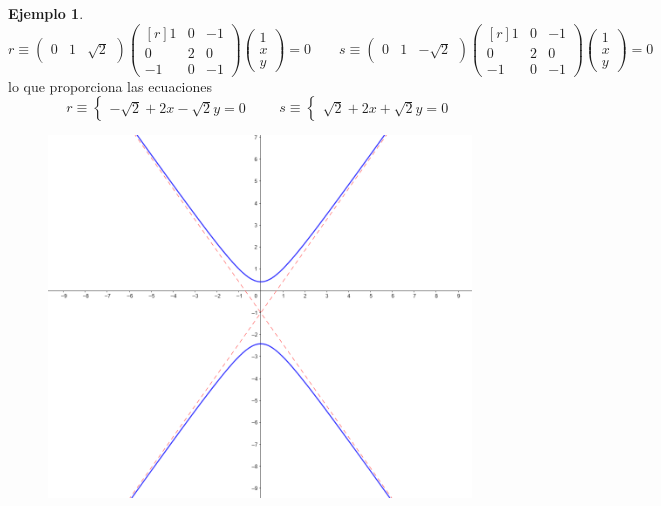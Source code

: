 \documentclass[12pt]{report}
\theoremstyle{definition}
\theoremstyle{definition}
\newtheorem{example}{Ejemplo}[chapter]
\theoremstyle{remark}
\begin{document}
\begin{example}
\[ r \equiv \begin{pmatrix}
        0 & 1 & \sqrt{2}
    \end{pmatrix}
    \begin{pmatrix*}[r]
    1 & 0 & -1 \\
    0 & 2 & 0 \\
    -1 & 0 & -1
    \end{pmatrix*} \begin{pmatrix}
        1 \\
        x \\
        y
    \end{pmatrix} = 0  \qquad s \equiv \begin{pmatrix}
        0 & 1 & -\sqrt{2}
    \end{pmatrix}
    \begin{pmatrix*}[r]
    1 & 0 & -1 \\
    0 & 2 & 0 \\
    -1 & 0 & -1
    \end{pmatrix*} \begin{pmatrix}
        1 \\
        x \\
        y
    \end{pmatrix} = 0\]
lo que proporciona las ecuaciones
\[r \equiv \begin{cases}
        -\sqrt{2}+2x-\sqrt{2}y = 0
    \end{cases} \qquad s \equiv \begin{cases}
        \sqrt{2}+2x+\sqrt{2}y = 0
    \end{cases}\]
\end{example}

\begin{figure}[h]
\includegraphics[scale = 0.40]{6.3_2}
\centering
\end{figure}
\end{document}
